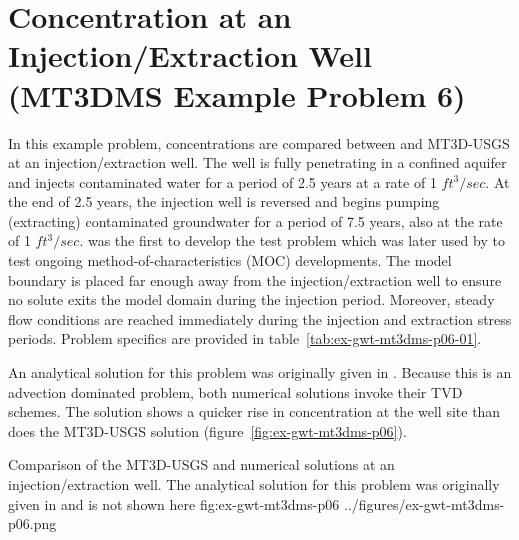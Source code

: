 \section{Concentration at an Injection/Extraction Well (MT3DMS Example Problem 6)}

In this example problem, concentrations are compared between \mf and MT3D-USGS at an injection/extraction well. The well is fully penetrating in a confined aquifer and injects contaminated water for a period of 2.5 years at a rate of 1 $ft^3/sec$.  At the end of 2.5 years, the injection well is reversed and begins pumping (extracting) contaminated groundwater for a period of 7.5 years, also at the rate of 1 $ft^3/sec$.  \cite{elkadi1988} was the first to develop the test problem which was later used by \cite{zheng1993} to test ongoing method-of-characteristics (MOC) developments.  The model boundary is placed far enough away from the injection/extraction well to ensure no solute exits the model domain during the injection period.  Moreover, steady flow conditions are reached immediately during the injection and extraction stress periods.  Problem specifics are provided in table~\ref{tab:ex-gwt-mt3dms-p06-01}.



An analytical solution for this problem was originally given in \cite{gelhar1971}.  Because this is an advection dominated problem, both numerical solutions invoke their TVD schemes.  The \mf solution shows a quicker rise in concentration at the well site than does the MT3D-USGS solution (figure~\ref{fig:ex-gwt-mt3dms-p06}). 

\begin{StandardFigure}
	{Comparison of the MT3D-USGS and \mf numerical solutions at an injection/extraction well. The analytical solution for this problem was originally given in \citep{gelhar1971} and is not shown here} 
	{fig:ex-gwt-mt3dms-p06}
	{../figures/ex-gwt-mt3dms-p06.png}
\end{StandardFigure}


